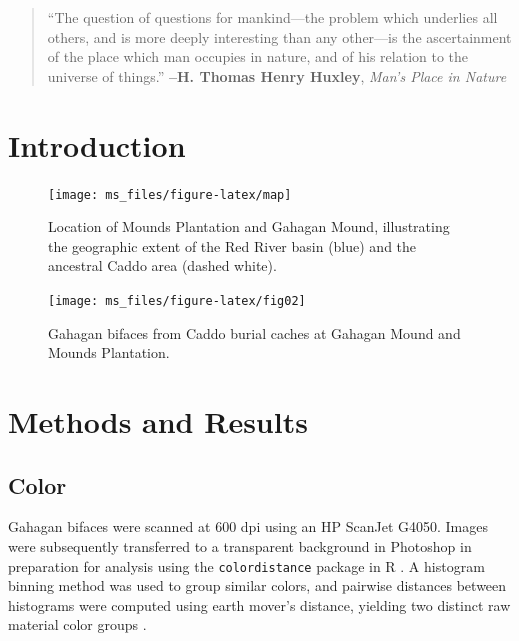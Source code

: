 \documentclass[]{interact}
\theoremstyle{plain}%
\theoremstyle{definition}
\theoremstyle{remark}
\begin{document}
\begin{quote}
``The question of questions for mankind---the problem which underlies
all others, and is more deeply interesting than any other---is the
ascertainment of the place which man occupies in nature, and of his
relation to the universe of things.'' \textbf{--H. Thomas Henry Huxley},
\emph{Man's Place in Nature}
\end{quote}

\hypertarget{introduction}{%
\section{Introduction}\label{introduction}}

\begin{figure}
\texttt{[image: ms\_files/figure-latex/map]} \caption{Location of Mounds Plantation and Gahagan Mound, illustrating the geographic extent of the Red River basin (blue) and the ancestral Caddo area (dashed white).}\label{fig:figmap}
\end{figure}

\begin{figure}
\texttt{[image: ms\_files/figure-latex/fig02]} \caption{Gahagan bifaces from Caddo burial caches at Gahagan Mound and Mounds Plantation.}\label{fig:figbifaces}
\end{figure}

\hypertarget{methods-and-results}{%
\section{Methods and Results}\label{methods-and-results}}

\hypertarget{color}{%
\subsection{Color}\label{color}}

Gahagan bifaces were scanned at 600 dpi using an HP ScanJet G4050.
Images were subsequently transferred to a transparent background in
Photoshop in preparation for analysis using the \texttt{colordistance}
package in R \citep{R, RN11200}. A histogram binning method was used to
group similar colors, and pairwise distances between histograms were
computed using earth mover's distance, yielding two distinct raw
material color groups \citep{RN11201, RN11200}.
\end{document}
